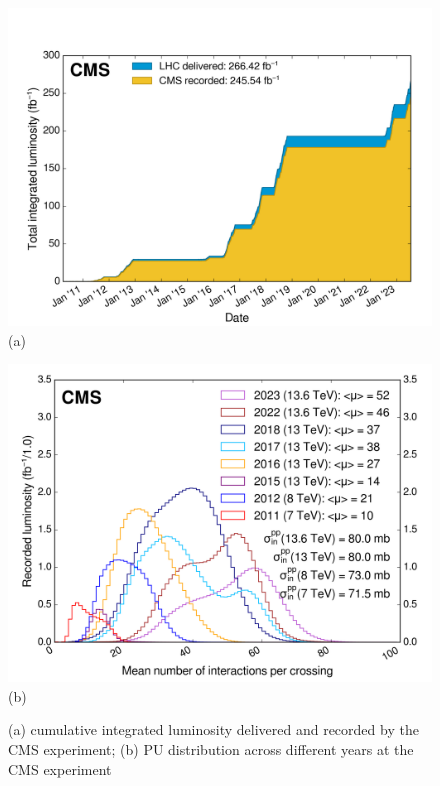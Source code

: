 \begin{figure}[h!]
    \centering
    \begin{minipage}{0.52\linewidth}
        
        \centering
        \includegraphics[width=\linewidth]{fig//chap03-cms/lumi.png}
        (a)
    \end{minipage}
    \begin{minipage}{0.47\linewidth}
        \vspace{0.6cm}
        \centering
        \includegraphics[width=\linewidth]{fig//chap03-cms/pileup.png}
        (b)
    \end{minipage}
    \caption{(a) cumulative integrated luminosity delivered and recorded by the CMS experiment; (b) PU distribution across different years at the CMS experiment \cite{LumiPublicResultsTWiki}}
    \label{fig:lumi_pu}
\end{figure}

